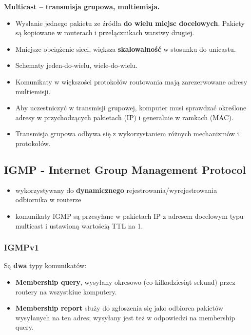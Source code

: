 \documentclass[../main.tex]{subfiles}
\begin{document}
    \textbf{Multicast – transmisja grupowa, multiemisja.}
    \begin{itemize}
        \item Wysłanie jednego pakietu ze źródła \textbf{do wielu miejsc docelowych}. Pakiety są kopiowane
        w routerach i przełącznikach warstwy drugiej.
        \item Mniejsze obciążenie
        sieci, większa \textbf{skalowalność} w stosunku do unicastu.
        \item Schematy jeden-do-wielu, wiele-do-wielu.
        \item Komunikaty w większości protokołów routowania mają zarezerwowane adresy multiemisji.
        \item Aby uczestniczyć w transmisji grupowej, komputer musi sprawdzać określone adresy w
        przychodzących pakietach (IP) i generalnie w ramkach (MAC).
        \item Transmisja grupowa odbywa się z wykorzystaniem różnych mechanizmów i protokołów.
\end{itemize}

    \subsection{IGMP - Internet Group Management Protocol}
    \begin{itemize}
        \item wykorzystywany do \textbf{dynamicznego} rejestrowania/wyrejestrowania
        odbiornika w routerze
        \item komunikaty IGMP są przesyłane w pakietach IP z adresem docelowym typu multicast i
        ustawioną wartością TTL na 1.
    \end{itemize}


    \subsubsection{IGMPv1}
    Są \textbf{dwa} typy komunikatów:
    \begin{itemize}
        \item \textbf{Membership query}, wysyłany okresowo (co
        kilkadziesiąt sekund) przez routery na wszystkiue komputery.
        \item \textbf{Membership report} służy do zgłoszenia się jako odbiorca pakietów wysyłanych na ten adres; wysyłany jest też w odpowiedzi na membership query.
    \end{itemize}
\end{document}
